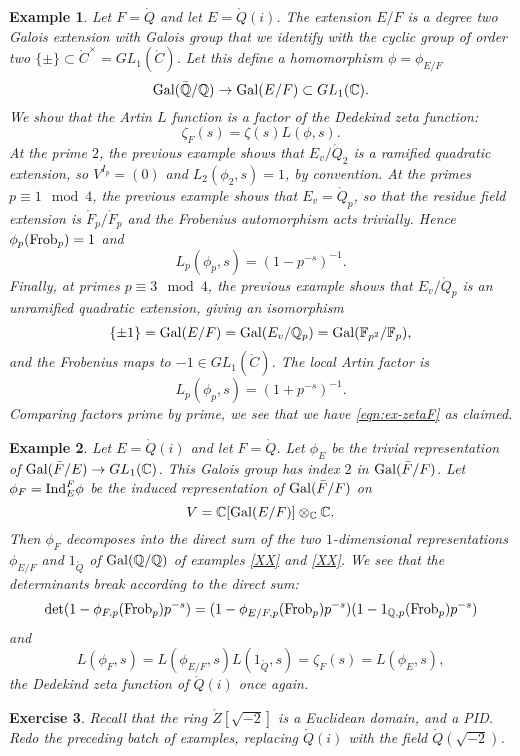 \documentclass{amsart}
\newtheorem{exercise}{Exercise}
\newtheorem{example}[exercise]{Example}
\def\CC{\ring{C}}
\def\oG{\op{Gal}}
\begin{document}
\begin{example} Let $F=\ring{Q}$ and let $E=\ring{Q}(i)$.  The extension
$E/F$ is a degree two Galois extension with Galois group that we identify
with the cyclic group of order two $\{\pm\}\subset\CC^\times=GL_1(\CC)$.
Let this define a homomorphism $\phi=\phi_{E/F}$
\[
\oG(\bar{\ring{Q}}/\ring{Q})\to \oG(E/F) \subset GL_1(\CC).
\]
We show that the Artin $L$ function is a factor of the Dedekind zeta function:
\begin{equation}\label{eqn:ex-zetaF}
\zeta_F(s) = \zeta(s) L(\phi,s).
\end{equation}
At the prime $2$, the previous example shows that $E_v/\ring{Q}_2$ is a ramified
quadratic extension, so $V^{I_p}=(0)$ and $L_2(\phi_2,s)=1$, by convention.
At the primes $p\equiv 1 \mod 4$, the previous example shows that $E_v=\ring{Q}_p$,
so that the residue field extension is $\ring{F}_p/\ring{F}_p$ and the Frobenius
automorphism acts trivially.  Hence $\phi_p({\operatorname{Frob}}_p)=1$ and 
\[
L_p(\phi_p,s)=(1-p^{-s})^{-1}.
\]
Finally, at primes $p\equiv 3\mod 4$, the previous example shows that $E_v/\ring{Q}_p$
is an unramified quadratic extension, giving an isomorphism
\[
\{\pm1\}=\oG(E/F) = \oG(E_v/\ring{Q}_p) = \oG(\ring{F}_{p^2}/\ring{F}_p),
\]
and the Frobenius maps to $-1\in GL_1(\CC)$.  The local Artin factor is
\[
L_p(\phi_p,s) = (1+p^{-s})^{-1}.
\]
Comparing factors prime by prime, we see that we have
\eqref{eqn:ex-zetaF} as claimed.
\end{example}

\begin{example} Let $E=\ring{Q}(i)$ and let $F=\ring{Q}$.  Let $\phi_E$ be the
trivial representation of $\oG(\bar{F}/E)\to GL_1(\CC)$.  This Galois
group has index $2$ in $\oG(\bar F/F)$.  Let 
$\phi_F={\operatorname{Ind}}_E^F\phi$ be the induced representation
of $\oG(\bar{F}/F)$ on
\[
V=\CC[\oG(E/F)]\otimes_{\CC} \CC.
\]
Then $\phi_F$ decomposes into the direct sum of the two $1$-dimensional representations
$\phi_{E/F}$ and $1_{\ring{Q}}$
of $\oG(\ring{Q}/\ring{Q})$
of examples \ref{XX} and \ref{XX}.  We see that
the determinants break according to the direct sum:
\[
\det(1 - \phi_{F,p}({\operatorname{Frob}}_p)p^{-s}) = 
(1 - \phi_{E/F,p}({\operatorname{Frob}}_p)p^{-s})(1-1_{{\mathbb{Q},p}}({\operatorname{Frob}}_p)p^{-s})
\]
and 
\[
L(\phi_F,s) = L(\phi_{E/F},s) L(1_{\ring{Q}},s) = \zeta_F(s) = L(\phi_E,s),
\]
the Dedekind zeta function of $\ring{Q}(i)$ once again.
\end{example}

\begin{exercise} Recall that the ring $\ring{Z}[\sqrt{-2}]$ is a
  Euclidean domain, and a PID.  Redo the preceding batch of examples,
  replacing $\ring{Q}(i)$ with the field $\ring{Q}(\sqrt{-2})$.
\end{exercise}
\end{document}
